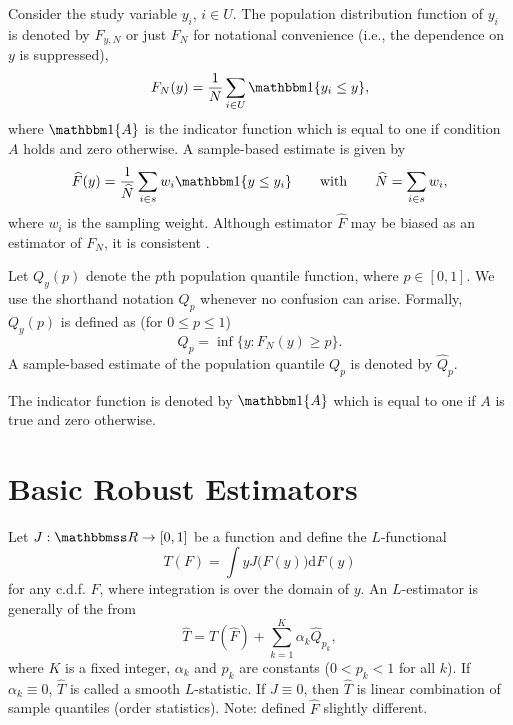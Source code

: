 \documentclass[a4paper,oneside,11pt,DIV=12]{scrartcl}
\newcommand{\indicator}{{\mathbbm 1}}   %
\newcommand{\R}{{\mathbbmss R}}         %
\theoremstyle{remark}
\begin{document}
Consider the study variable $y_i$, $i \in U$. The population distribution function of $y_i$ is denoted by $F_{y,N}$ or just $F_N$ for notational convenience (i.e., the dependence on $y$ is suppressed),
\begin{equation*}
   F_N(y) = \frac{1}{N}\sum_{i \in U} \indicator\{y_i \leq y \},
\end{equation*}
\noindent where $\indicator\{ A \}$ is the indicator function which is equal to one if condition $A$ holds and zero otherwise. A sample-based estimate is given by
\begin{equation*}
   \widehat{F}(y) = \frac{1}{\widehat{N}}\sum_{i \in s} w_i \indicator\{y \leq y_i \} \qquad \text{with} \qquad \widehat{N} = \sum_{i \in s} w_i,
\end{equation*}
\noindent where $w_i$ is the sampling weight. Although estimator $\widehat{F}$ may be biased as an estimator of $F_N$, it is consistent \citep[][]{sarndal_swensson_etal_1992}.

Let $Q_y(p)$ denote the $p$th population quantile function, where $p \in [0,1]$. We use the shorthand notation $Q_p$ whenever no confusion can arise. Formally, $Q_y(p)$ is defined as (for $0 \leq p \leq 1$)
\begin{equation*}
   Q_p = \inf \{ y : F_N(y) \geq p \}.
\end{equation*}
\noindent A sample-based estimate of the population quantile $Q_p$ is denoted by $\widehat{Q}_p$.

The indicator function is denoted by $\indicator\{A\}$ which is equal to one if $A$ is true and zero otherwise.

\section{Basic Robust Estimators}\label{sec:basic}

Let $J: \R \rightarrow [0,1]$ be a function and define the $L$-functional
\begin{equation}
    T(F) = \int y J\big(F(y)\big)\mathrm{d}F(y)
\end{equation}
\noindent for any c.d.f. $F$, where integration is over the domain of $y$. An $L$-estimator is generally of the from \citep{shao_1994}
\begin{equation}\label{eq:l_est}
    \widehat{T} = T(\widehat{F}) + \sum_{k = 1}^K \alpha_k \widehat{Q}_{p_k},
\end{equation}
\noindent where $K$ is a fixed integer, $\alpha_k$ and $p_k$ are constants ($0 < p_k < 1$ for all $k$). If $\alpha_k \equiv 0$, $\widehat{T}$ is called a smooth $L$-statistic. If $J \equiv 0$, then $\widehat{T}$ is linear combination of sample quantiles (order statistics). Note: \citet{shao_1994} defined $\widehat{F}$ slightly different.
\end{document}
